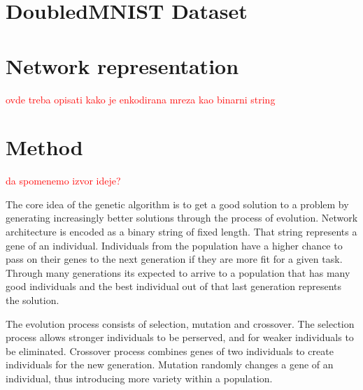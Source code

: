 \documentclass[eng]{simposium}
\begin{document}
\section{DoubledMNIST Dataset}

\section{Network representation}
\label{sec:repr}

\textcolor{red}{ovde treba opisati kako je enkodirana mreza kao binarni string}



\section{Method}

\textcolor{red}{da spomenemo izvor ideje?}

The core idea of the genetic algorithm is to get a good solution to a problem by generating increasingly better solutions through the process of evolution.
Network architecture is encoded as a binary string of fixed length. That string represents a gene of an individual.
Individuals from the population have a higher chance to pass on their genes to the next generation if they are more fit for a given task.
Through many generations its expected to arrive to a population that has many good individuals and the best individual out of that last generation represents the solution.

The evolution process consists of selection, mutation and crossover. 
The selection process allows stronger individuals to be perserved, and for weaker individuals to be eliminated.
Crossover process combines genes of two individuals to create individuals for the new generation.
Mutation randomly changes a gene of an individual, thus introducing more variety within a population.
\end{document}
